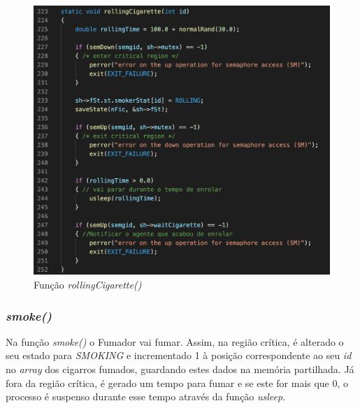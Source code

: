 \documentclass[10pt,portuguese]{article}
\begin{document}
\begin{figure}[!h]
    \centering
    \includegraphics[width=\textwidth]{images/implementation/rolling.png}
    \caption{Função \textit{rollingCigarette()}}
\end{figure}

\clearpage

\subsubsection{\textit{smoke()}}

\par Na função \textit{smoke()} o Fumador vai fumar. Assim, na região crítica, é alterado o seu estado para \textit{SMOKING} e incrementado 1 à posição correspondente ao seu \textit{id} no \textit{array} dos cigarros fumados, guardando estes dados na memória partilhada. Já fora da região crítica, é gerado um tempo para fumar e se este for mais que 0, o processo é suspenso durante esse tempo através da função \textit{usleep}.
\end{document}
